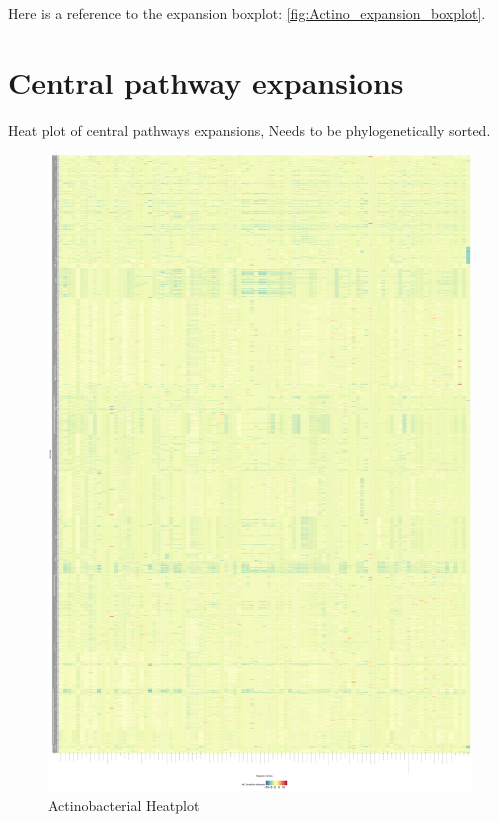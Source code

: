 \documentclass[12pt,twoside]{reedthesis}
\begin{document}
  Here is a reference to the expansion boxplot:
  \autoref{fig:Actino_expansion_boxplot}.\\
  \clearpage 
  
  \section{Central pathway expansions}\label{central-pathway-expansions-1}
  
  Heat plot of central pathways expansions, Needs to be phylogenetically
  sorted.
  
  \begin{figure}[h!tbp]
  \centering
  \includegraphics[angle = 0,scale = 0.7]{chapter4/HeatPlotActinos.pdf}
  \caption[Actinobacterial Heatplot]{\normalsize{Actinobacterial Heatplot}}
  \label{fig:ActinoPlot}
  \end{figure}
  
\end{document}
